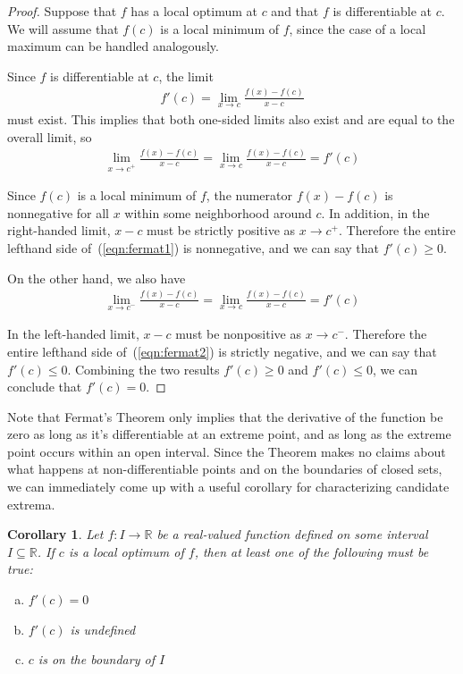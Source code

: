 \documentclass[11pt]{article}
\newtheorem{corollary}[theorem]{Corollary} %
\theoremstyle{definition} %
\begin{document}
\begin{proof}
	Suppose that $f$ has a local optimum at $c$ and that $f$ is differentiable at $c$. We will assume that $f(c)$ is a local minimum of $f$, since the case of a local maximum can be handled analogously.
	
	Since $f$ is differentiable at $c$, the limit
	\begin{align*}
		f'(c) = \lim_{x \to c} \frac{f(x) - f(c)}{x - c}
	\end{align*}
	must exist. This implies that both one-sided limits also exist and are equal to the overall limit, so
	\begin{align}
		\label{eqn:fermat1} \lim_{x \to c^+} \frac{f(x) - f(c)}{x - c} = \lim_{x \to c} \frac{f(x) - f(c)}{x - c} = f'(c)
	\end{align}
	
	Since $f(c)$ is a local minimum of $f$, the numerator $f(x) - f(c)$ is nonnegative for all $x$ within some neighborhood around $c$. In addition, in the right-handed limit, $x - c$ must be strictly positive as $x \to c^+$. Therefore the entire lefthand side of~(\ref{eqn:fermat1}) is nonnegative, and we can say that $f'(c) \ge 0$.
	
	On the other hand, we also have
	\begin{align}
		\label{eqn:fermat2} \lim_{x \to c^-} \frac{f(x) - f(c)}{x - c} = \lim_{x \to c} \frac{f(x) - f(c)}{x - c} = f'(c)
	\end{align}
	
	In the left-handed limit, $x - c$ must be nonpositive as $x \to c^-$. Therefore the entire lefthand side of~(\ref{eqn:fermat2}) is strictly negative, and we can say that $f'(c) \le 0$. Combining the two results $f'(c) \ge 0$ and $f'(c) \le 0$, we can conclude that $f'(c) = 0$.
\end{proof}

Note that Fermat's Theorem only implies that the derivative of the function be zero as long as it's differentiable at an extreme point, and as long as the extreme point occurs within an open interval. Since the Theorem makes no claims about what happens at non-differentiable points and on the boundaries of closed sets, we can immediately come up with a useful corollary for characterizing candidate extrema.

\begin{corollary}
\label{cor:fermat}
	Let $f : I \to \mathbb{R}$ be a real-valued function defined on some interval $I \subseteq \mathbb{R}$. If $c$ is a local optimum of $f$, then at least one of the following must be true:
	\begin{enumerate}[(a)]
		\item $f'(c) = 0$
		\item $f'(c)$ is undefined
		\item $c$ is on the boundary of $I$
	\end{enumerate}
\end{corollary}
\end{document}
